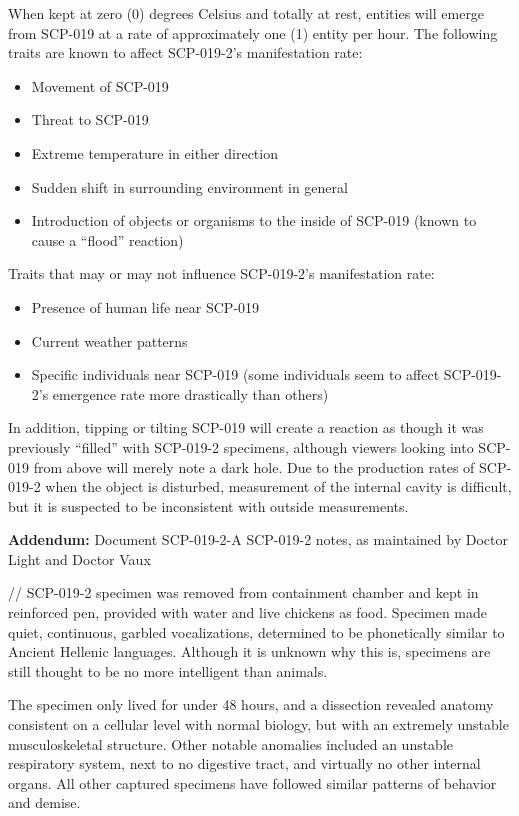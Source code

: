 When kept at zero (0) degrees Celsius and totally at rest, entities will emerge from SCP-019 at a rate of approximately one (1) entity per hour. The following traits are known to affect SCP-019-2's manifestation rate:
\begin{itemize}
\item Movement of SCP-019
\item Threat to SCP-019
\item Extreme temperature in either direction
\item Sudden shift in surrounding environment in general
\item Introduction of objects or organisms to the inside of SCP-019 (known to cause a “flood” reaction)
\end{itemize}
Traits that may or may not influence SCP-019-2's manifestation rate:
\begin{itemize}
\item Presence of human life near SCP-019
\item Current weather patterns
\item Specific individuals near SCP-019 (some individuals seem to affect SCP-019-2's emergence rate more drastically than others)
\end{itemize}
In addition, tipping or tilting SCP-019 will create a reaction as though it was previously “filled” with SCP-019-2 specimens, although viewers looking into SCP-019 from above will merely note a dark hole. Due to the production rates of SCP-019-2 when the object is disturbed, measurement of the internal cavity is difficult, but it is suspected to be inconsistent with outside measurements.

\textbf{Addendum:} Document SCP-019-2-A
SCP-019-2 notes, as maintained by Doctor Light and Doctor Vaux

//\linebreak
SCP-019-2 specimen was removed from containment chamber and kept in reinforced pen, provided with water and live chickens as food. Specimen made quiet, continuous, garbled vocalizations, determined to be phonetically similar to Ancient Hellenic languages. Although it is unknown why this is, specimens are still thought to be no more intelligent than animals.

The specimen only lived for under 48 hours, and a dissection revealed anatomy consistent on a cellular level with normal biology, but with an extremely unstable musculoskeletal structure. Other notable anomalies included an unstable respiratory system, next to no digestive tract, and virtually no other internal organs. All other captured specimens have followed similar patterns of behavior and demise.

